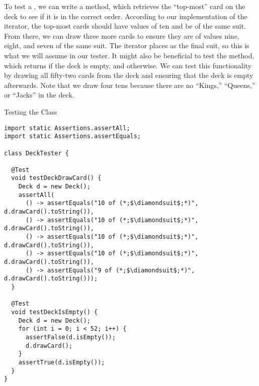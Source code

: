 To test a , we can write a  method, which retrieves the ``top-most'' card on the deck to see if it is in the correct order. According to our implementation of the iterator, the top-most cards should have values of ten and be of the same suit. From there, we can draw three more cards to ensure they are of values nine, eight, and seven of the same suit. The iterator places  as the final suit, so this is what we will assume in our tester. It might also be beneficial to test the  method, which returns  if the deck is empty, and  otherwise. We can test this functionality by drawing all fifty-two cards from the deck and ensuring that the deck is empty afterwards. Note that we draw four tens because there are no ``Kings,'' ``Queens,'' or ``Jacks'' in the deck.

\begin{cl}{Testing the  Class}
\begin{lstlisting}[language=MyJava]
import static Assertions.assertAll;
import static Assertions.assertEquals;

class DeckTester {

  @Test
  void testDeckDrawCard() {
    Deck d = new Deck();
    assertAll(
      () -> assertEquals("10 of (*;$\diamondsuit$;*)", d.drawCard().toString()),
      () -> assertEquals("10 of (*;$\diamondsuit$;*)", d.drawCard().toString()),
      () -> assertEquals("10 of (*;$\diamondsuit$;*)", d.drawCard().toString()),
      () -> assertEquals("10 of (*;$\diamondsuit$;*)", d.drawCard().toString()),
      () -> assertEquals("9 of (*;$\diamondsuit$;*)", d.drawCard().toString()));
  }

  @Test
  void testDeckIsEmpty() {
    Deck d = new Deck();
    for (int i = 0; i < 52; i++) {
      assertFalse(d.isEmpty());
      d.drawCard();
    }
    assertTrue(d.isEmpty());
  }
}
\end{lstlisting}
\end{cl}

